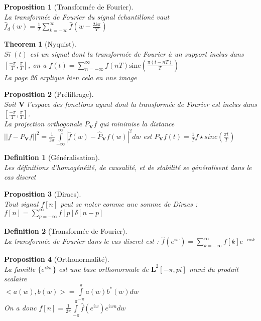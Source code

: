 \documentclass[a4paper]{article}
\newtheorem*{prop}{Proposition}
\newtheorem*{definition}{Definition}
\newtheorem*{theorem}{Theorem}
\renewcommand{\(}{\left(}
\renewcommand{\)}{\right)}
\begin{document}
\begin{prop}[Transformée de Fourier]~\\
  La transformée de Fourier du signal échantilloné vaut $\hat{f}_d(w) =
  \frac{1}{T} \sum\limits_{k=-\infty}^\infty \hat{f}(w-\frac{2k\pi}{T})$
\end{prop}

\begin{theorem}[Nyquist]~\\
  Si $(t)$ est un signal dont la transformée de Fourier à un support inclus dans $[\frac{-\pi}{T},
  \frac{\pi}{T}]$, on a $f(t) =
  \sum\limits_{n=-\infty}^{\infty}f(nT)\mathrm{sinc}\(\frac{\pi(t-nT)}{T}\)$\\
  La page 26 explique bien cela en une image
\end{theorem}

\begin{prop}[Préfiltrage]~\\
  Soit $\mathbf{V}$ l'espace des fonctions ayant dont la transformée de Fourier
  est inclus dans $[\frac{-\pi}{T}, \frac{\pi}{T}]$.\\
  La projection orthogonale $P_{\mathbf{V}}f$ qui minimise la distance
  $||f - P_{\mathbf{V}}f||^2 = \frac{1}{2\pi}\int\limits_{-\infty}^\infty
  |\hat{f}(w) - \hat{P}_{\mathbf{V}}f(w)|^2dw$
  est $P_{\mathbf{V}}f(t) = \frac{1}{T}f \star sinc\(\frac{\pi t}{T}\)$
\end{prop}

\begin{definition}[Généralisation]~\\
  Les définitions d'homogénéité, de causalité, et de stabilité se généralisent
  dans le cas discret
\end{definition}

\begin{prop}[Diracs]~\\
  Tout signal $f[n]$ peut se noter comme une somme de Diracs : $f[n] = \sum\limits_{p=-\infty}^{\infty}f[p]\delta[n-p]$
\end{prop}

\begin{definition}[Transformée de Fourier]~\\
  La transformée de Fourier dans le cas discret est : $\hat{f}(e^{iw}) =
  \sum\limits_{k=-\infty}^\infty f[k]e^{-iwk}$
\end{definition}

\begin{prop}[Orthonormalité]~\\
  La famille $\{e^{ikw}\}$ est une base orthonormale de $\mathbf{L}^2[-\pi,pi]$
  muni du produit scalaire\\
  $<a(w),b(w)> = \int\limits_{-\pi}^{\pi}a(w)b^*(w)dw$\\
  On a donc $f[n] = \frac{1}{2\pi}
  \int\limits_{-\pi}^{\pi}\hat{f}(e^{iw})e^{iwn}dw$\\
\end{prop}
\end{document}
